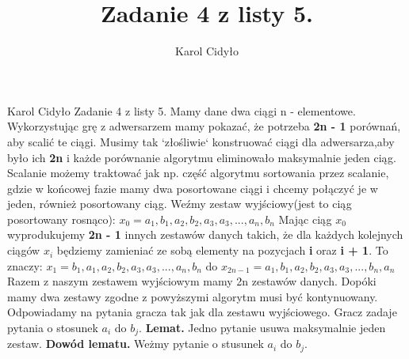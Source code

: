 \documentclass[a4paper,12pt]{article}
\author{Karol Cidyło}
\title {Zadanie 4 z listy 5.}
\begin{document}
Karol Cidyło \newline \newline \newline
Zadanie 4 z listy 5. \newline \newline
Mamy dane dwa ciągi n - elementowe. Wykorzystując grę z adwersarzem mamy pokazać, że potrzeba \textbf{2n - 1} porównań, aby scalić te ciągi. 
Musimy tak `złośliwie` konstruować ciągi dla adwersarza,aby było ich \textbf{2n} i każde porównanie algorytmu eliminowało maksymalnie jeden ciąg.\newline
Scalanie możemy traktować jak np. część algorytmu sortowania przez scalanie, gdzie w końcowej fazie mamy dwa posortowane ciągi i chcemy połączyć je w jeden,
również  posortowany ciąg. \newline \newline
Weźmy zestaw wyjściowy(jest to ciąg posortowany rosnąco): \newline
$x_0 = a_1, b_1, a_2, b_2, a_3, a_3,...,  a_n, b_n$ \newline
Mając ciąg $x_0$ wyprodukujemy \textbf{2n - 1} innych zestawów danych takich, że dla każdych kolejnych ciągów $x_i$ będziemy zamieniać
ze sobą elementy na pozycjach  \textbf{i} oraz \textbf{i + 1}. To znaczy: \newline
$x_1 = b_1, a_1, a_2, b_2, a_3, a_3,...,  a_n, b_n$ \newline
do \newline
$x_{2n-1}= a_1, b_1, a_2, b_2, a_3, a_3,...,  b_n, a_n$ \newline \newline
Razem z naszym zestawem wyjściowym mamy 2n zestawów danych.
Dopóki mamy dwa zestawy zgodne z powyższymi algorytm musi być kontynuowany. Odpowiadamy na pytania gracza tak jak dla zestawu wyjściowego. \newline \newline
Gracz zadaje pytania o stosunek $a_i$ do $b_j$. \newline\newline
\textbf{Lemat.} \newline
Jedno pytanie usuwa maksymalnie jeden zestaw. \newline\newline
\textbf{Dowód lematu.} \newline
Weżmy pytanie o stusunek $a_i$ do $b_j$.
\end{document}
